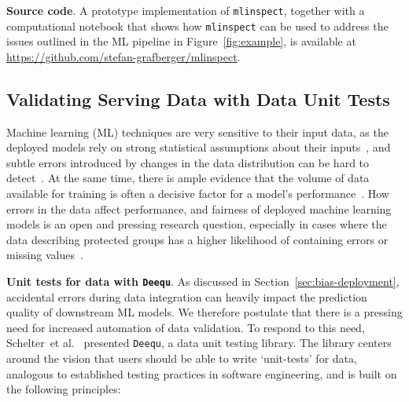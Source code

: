 \documentclass[11pt]{article}
\newcommand{\etal}{et al.\xspace}
\newcommand{\mlinspect}{\stt{mlinspect}\xspace}
\newcommand{\deequ}{\stt{Deequ}\xspace}
\newcommand{\header}[1]{\vspace{1mm}\noindent\textbf{#1}.}
\newcommand{\surl}[1]{{\footnotesize\url{#1}}}
\newcommand{\stt}[1]{{\footnotesize\texttt{#1}}}
\begin{document}
\header{Source code} A prototype implementation of \mlinspect, together with a computational notebook that shows how \mlinspect can be used to address the issues outlined in the ML pipeline in Figure~\ref{fig:example},  is available at \surl{https://github.com/stefan-grafberger/mlinspect}.


\subsection{Validating Serving Data with Data Unit Tests}
\label{sec:validate}

Machine learning (ML) techniques are very sensitive to their input data, as the deployed models rely on strong statistical assumptions about their inputs~\cite{sculley2015hidden}, and subtle errors introduced by changes in the data distribution can be hard to detect~\cite{polyzotis2017data}. At the same time, there is ample evidence that the volume of data available for training is often a decisive factor for a model’s performance~\cite{halevy2009unreasonable}.  How errors in the data affect performance, and fairness of deployed machine learning models is an open and pressing research question, especially in cases where the data describing protected groups has a higher likelihood of containing errors or missing values~\cite{DBLP:conf/edbt/SchelterHKS20}.

\header{Unit tests for data with \deequ} As discussed in Section~\ref{sec:bias-deployment}, accidental errors during data integration can heavily impact the prediction quality of downstream ML models. We therefore postulate that there is a pressing need for increased automation of data validation.   To respond to this need,
Schelter~\etal~\cite{schelter2018automating} presented \deequ, a data unit testing library. The library centers around the vision  that users should be able to write ‘unit-tests’ for data, analogous to established testing practices in software engineering, and is built on the following principles: 
\end{document}
